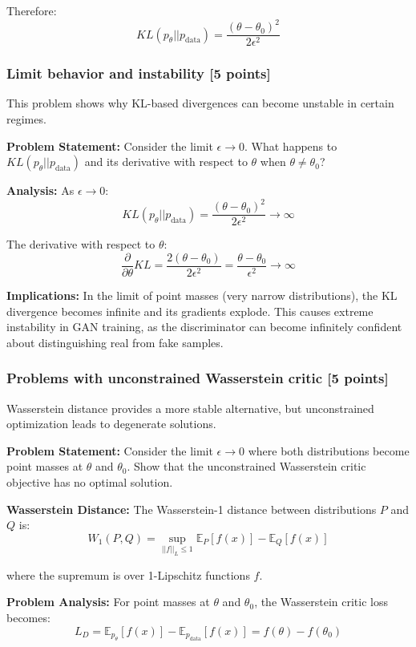 \documentclass{article}
\begin{document}
Therefore:
\[
KL(p_\theta || p_{\text{data}}) = \frac{(\theta - \theta_0)^2}{2\epsilon^2}
\]

\subsubsection{Limit behavior and instability [5 points]}

This problem shows why KL-based divergences can become unstable in certain regimes.

\textbf{Problem Statement:} Consider the limit $\epsilon \to 0$. What happens to $KL(p_\theta||p_{\text{data}})$ and its derivative with respect to $\theta$ when $\theta \neq \theta_0$?

\textbf{Analysis:} As $\epsilon \to 0$:
\[
KL(p_\theta || p_{\text{data}}) = \frac{(\theta - \theta_0)^2}{2\epsilon^2} \to \infty
\]

The derivative with respect to $\theta$:
\[
\frac{\partial}{\partial \theta} KL = \frac{2(\theta - \theta_0)}{2\epsilon^2} = \frac{\theta - \theta_0}{\epsilon^2} \to \infty
\]

\textbf{Implications:} In the limit of point masses (very narrow distributions), the KL divergence becomes infinite and its gradients explode. This causes extreme instability in GAN training, as the discriminator can become infinitely confident about distinguishing real from fake samples.

\subsubsection{Problems with unconstrained Wasserstein critic [5 points]}

Wasserstein distance provides a more stable alternative, but unconstrained optimization leads to degenerate solutions.

\textbf{Problem Statement:} Consider the limit $\epsilon \to 0$ where both distributions become point masses at $\theta$ and $\theta_0$. Show that the unconstrained Wasserstein critic objective has no optimal solution.

\textbf{Wasserstein Distance:} The Wasserstein-1 distance between distributions $P$ and $Q$ is:
\[
W_1(P, Q) = \sup_{||f||_L \leq 1} \mathbb{E}_P[f(x)] - \mathbb{E}_Q[f(x)]
\]

where the supremum is over 1-Lipschitz functions $f$.

\textbf{Problem Analysis:} For point masses at $\theta$ and $\theta_0$, the Wasserstein critic loss becomes:
\[
L_D = \mathbb{E}_{p_\theta}[f(x)] - \mathbb{E}_{p_{\text{data}}}[f(x)] = f(\theta) - f(\theta_0)
\]
\end{document}
